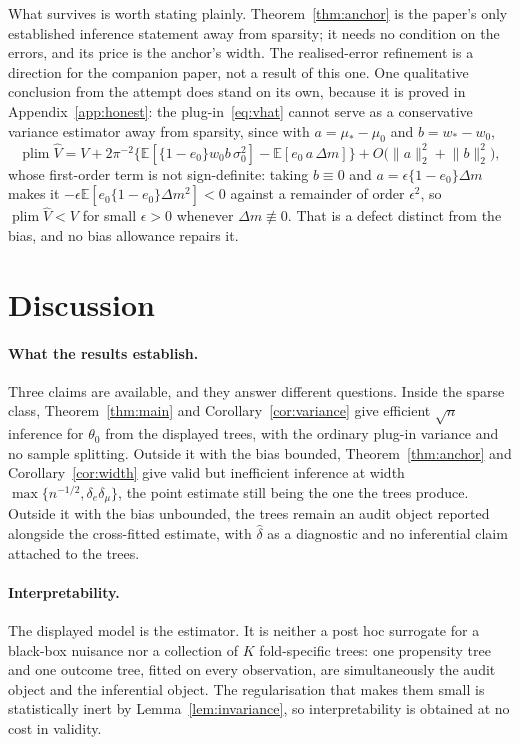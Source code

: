 \documentclass[11pt]{article}
\theoremstyle{plain}
\theoremstyle{definition}
\theoremstyle{remark}
\newcommand{\E}{\mathbb{E}}
\newcommand{\ez}{e_0}
\newcommand{\mz}{\mu_0}
\newcommand{\wz}{w_0}
\newcommand{\Vhat}{\widehat{V}}
\newcommand{\Ltwo}[1]{\lVert #1 \rVert_{2}}
\DeclareMathOperator{\plim}{plim}
\begin{document}
What survives is worth stating plainly. Theorem~\ref{thm:anchor} is the paper's
only established inference statement away from sparsity; it needs no condition on
the errors, and its price is the anchor's width. The realised-error refinement is a
direction for the companion paper, not a result of this one. One qualitative
conclusion from the attempt does stand on its own, because it is proved in
Appendix~\ref{app:honest}: the plug-in~\eqref{eq:vhat} cannot serve as a
conservative variance estimator away from sparsity, since with $a=\mu_*-\mz$ and
$b=w_*-\wz$,
\[
  \plim\Vhat=V+2\pi^{-2}\bigl\{\E[\{1-\ez\}\wz b\,\sigma_0^2]
   -\E[\ez\,a\,\Delta m]\bigr\}+O\bigl(\Ltwo a^2+\Ltwo b^2\bigr),
\]
whose first-order term is not sign-definite: taking $b\equiv0$ and
$a=\epsilon\{1-\ez\}\Delta m$ makes it $-\epsilon\E[\ez\{1-\ez\}\Delta m^2]<0$
against a remainder of order $\epsilon^2$, so $\plim\Vhat<V$ for small $\epsilon>0$
whenever $\Delta m\not\equiv0$. That is a defect distinct from the bias, and no
bias allowance repairs it.

\section{Discussion}\label{sec:discussion}

\paragraph{What the results establish.}
Three claims are available, and they answer different questions. Inside the
sparse class, Theorem~\ref{thm:main} and Corollary~\ref{cor:variance} give
efficient $\sqrt n$ inference for $\theta_0$ from the displayed trees, with the
ordinary plug-in variance and no sample splitting. Outside it with the bias
bounded, Theorem~\ref{thm:anchor} and Corollary~\ref{cor:width} give valid but
inefficient inference at width $\max\{n^{-1/2},\delta_e\delta_\mu\}$, the point
estimate still being the one the trees produce. Outside it with the bias
unbounded, the trees remain an audit object reported alongside the cross-fitted
estimate, with $\widehat\delta$ as a diagnostic and no inferential claim
attached to the trees.

\paragraph{Interpretability.}
The displayed model is the estimator. It is neither a post hoc surrogate for a
black-box nuisance nor a collection of $K$ fold-specific trees: one propensity
tree and one outcome tree, fitted on every observation, are simultaneously the
audit object and the inferential object. The regularisation that makes them
small is statistically inert by Lemma~\ref{lem:invariance}, so
interpretability is obtained at no cost in validity.
\end{document}

